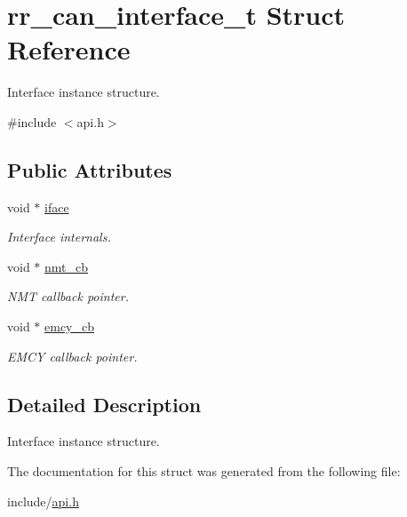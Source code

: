 \hypertarget{structrr__can__interface__t}{}\section{rr\+\_\+can\+\_\+interface\+\_\+t Struct Reference}
\label{structrr__can__interface__t}


Interface instance structure.  




{\ttfamily \#include $<$api.\+h$>$}

\subsection*{Public Attributes}
\begin{DoxyCompactItemize}
\item 
\mbox{\label{structrr__can__interface__t_a32b9f04063aeb237fc6c9d83fb68a585}} 
void $\ast$ \hyperlink{structrr__can__interface__t_a32b9f04063aeb237fc6c9d83fb68a585}{iface}
\begin{DoxyCompactList}\small\item\em Interface internals. \end{DoxyCompactList}\item 
\mbox{\label{structrr__can__interface__t_af91a302d7bb26a721480273c003cd5e4}} 
void $\ast$ \hyperlink{structrr__can__interface__t_af91a302d7bb26a721480273c003cd5e4}{nmt\+\_\+cb}
\begin{DoxyCompactList}\small\item\em N\+MT callback pointer. \end{DoxyCompactList}\item 
\mbox{\label{structrr__can__interface__t_a61df5cb8d1be7a841be8a47722cd52af}} 
void $\ast$ \hyperlink{structrr__can__interface__t_a61df5cb8d1be7a841be8a47722cd52af}{emcy\+\_\+cb}
\begin{DoxyCompactList}\small\item\em E\+M\+CY callback pointer. \end{DoxyCompactList}\end{DoxyCompactItemize}


\subsection{Detailed Description}
Interface instance structure. 

The documentation for this struct was generated from the following file\+:\begin{DoxyCompactItemize}
\item 
include/\hyperlink{api_8h}{api.\+h}\end{DoxyCompactItemize}
